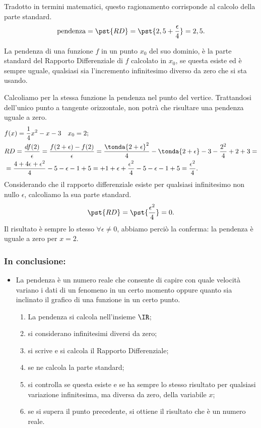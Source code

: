 Tradotto in termini matematici, questo ragionamento corrisponde al calcolo 
della parte standard.
\[
 \text{pendenza}=\pst{RD}=\pst{2,5 + \frac{\epsilon}{4}}=2,5.
\]
\begin{definizione}
 La pendenza di una funzione \(f\) in un punto \(x_0\) del suo dominio, è la 
parte standard del Rapporto Differenziale di \(f\) calcolato in \(x_0\), se 
questa esiste ed è sempre uguale, qualsiasi sia l'incremento infinitesimo 
diverso da zero che si sta usando.
\end{definizione}
\begin{esempio}
 Calcoliamo per la stessa funzione la pendenza nel punto del vertice. 
Trattandosi dell'unico punto a tangente orizzontale, non potrà che risultare 
una pendenza uguale a zero.\\
\begin{align*}
 &f(x) = \dfrac{1}{4} x^2 -x -3 \quad x_0=2;\\
 &RD=\frac{df(2)}{\epsilon}=\frac{f(2+\epsilon) - f(2)}{\epsilon}=
  \frac{\tonda{2 +\epsilon}^2}{4}  -\tonda{2 +\epsilon} -3 - 
           \frac{2^2}{4}  +2 +3 =\\
  &= \dfrac{4 +4 \epsilon +\epsilon^2}{4} -5 -\epsilon - 1 +5 =
 +1+ \epsilon +\frac{\epsilon^2}{4} -5 -\epsilon - 1 +5 =\frac{\epsilon^2}{4}.
  \end{align*}
Considerando che il rapporto differenziale esiste per qualsiasi infinitesimo 
non nullo \(\epsilon\), calcoliamo la sua parte standard.
\[
 \pst{RD}=\pst{\frac{\epsilon^2}{4}}=0.
\]
Il risultato è sempre lo stesso \(\forall \epsilon \ne 0\), abbiamo perciò la 
conferma: la pendenza è uguale a zero per \(x=2\).
\end{esempio}
\subsubsection{In conclusione:} 
\begin{itemize}
 \item La pendenza è un numero reale che consente di capire con quale velocità 
variano i dati di un fenomeno in un certo momento oppure quanto sia inclinato 
il grafico di una funzione in un certo punto.

\begin{enumerate}
\item La pendenza si calcola nell'insieme \(\IR\);
 \item si considerano infinitesimi diversi da zero;
 \item si scrive e si calcola il Rapporto Differenziale;
 \item se ne calcola la parte standard;
 \item si controlla se questa esiste e se ha sempre lo stesso risultato per 
qualsiasi variazione infinitesima, ma diversa da zero, della variabile \(x\);
 \item se si supera il punto precedente, si ottiene il risultato che è un 
numero reale.
\end{enumerate}
\end{itemize}

